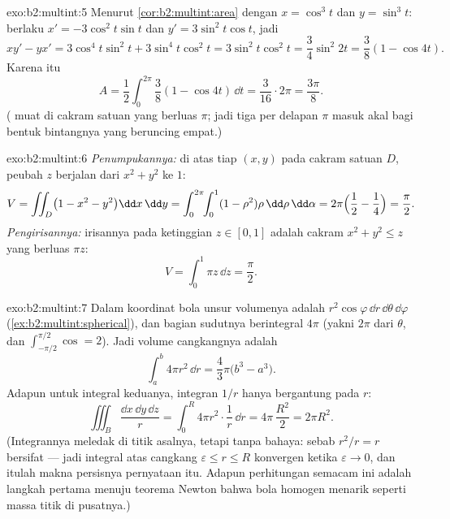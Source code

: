 \begin{solution}{exo:b2:multint:5}
Menurut \cref{cor:b2:multint:area} dengan $x = \cos^3 t$ dan $y = \sin^3 t$:
berlaku $x' = -3\cos^2 t\sin t$ dan $y' = 3\sin^2 t\cos t$, jadi
\[
xy' - yx' = 3\cos^4 t\sin^2 t + 3\sin^4 t\cos^2 t
= 3\sin^2 t\cos^2 t = \frac{3}{4}\sin^2 2t
= \frac{3}{8}(1 - \cos 4t) .
\]
Karena itu
\[
A = \frac12\int_0^{2\pi}\frac38(1 - \cos 4t)\,\dd t
= \frac{3}{16}\cdot 2\pi = \frac{3\pi}{8} .
\]
( muat di cakram satuan yang berluas $\pi$; jadi tiga per delapan
$\pi$ masuk akal bagi bentuk bintangnya yang beruncing empat.)
\end{solution}

\begin{solution}{exo:b2:multint:6}
\emph{Penumpukannya:} di atas tiap $(x, y)$ pada cakram satuan $D$, peubah $z$
berjalan dari $x^2 + y^2$ ke $1$:
\[
V = \iint_D \bigl(1 - x^2 - y^2\bigr)\dd x\,\dd y
= \int_0^{2\pi}\!\!\int_0^1 (1 - \rho^2)\rho\,\dd\rho\,\dd\alpha
= 2\pi\Bigl(\frac12 - \frac14\Bigr) = \frac\pi2 .
\]
\emph{Pengirisannya:} irisannya pada ketinggian $z \in [0, 1]$ adalah cakram
$x^2 + y^2 \leq z$ yang berluas $\pi z$:
\[
V = \int_0^1 \pi z\,\dd z = \frac\pi2 .
\]
\end{solution}

\begin{solution}{exo:b2:multint:7}
Dalam koordinat bola unsur volumenya adalah
$r^2\cos\varphi\,\dd r\,\dd\theta\,\dd\varphi$
(\cref{ex:b2:multint:spherical}), dan bagian sudutnya berintegral
$4\pi$ (yakni $2\pi$ dari $\theta$, dan $\int_{-\pi/2}^{\pi/2}\cos = 2$).
Jadi volume cangkangnya adalah
\[
\int_a^b 4\pi r^2\,\dd r = \frac43\pi\bigl(b^3 - a^3\bigr).
\]
Adapun untuk integral keduanya, integran $1/r$ hanya bergantung pada $r$:
\[
\iiint_B \frac{\dd x\,\dd y\,\dd z}{r}
= \int_0^R 4\pi r^2\cdot\frac1r\,\dd r
= 4\pi\,\frac{R^2}{2} = 2\pi R^2 .
\]
(Integrannya meledak di titik asalnya, tetapi tanpa bahaya: sebab $r^2/r = r$
bersifat  --- jadi integral atas cangkang $\varepsilon \leq r
\leq R$ konvergen ketika $\varepsilon \to 0$, dan itulah makna
persisnya pernyataan itu. Adapun perhitungan semacam ini adalah langkah
pertama menuju teorema Newton bahwa bola homogen menarik seperti
massa titik di pusatnya.)
\end{solution}

